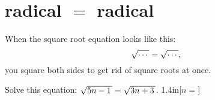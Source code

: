 \section{radical $=$ radical}

\begin{tcolorbox}[center,width=5in,colback=white]
    When the square root equation looks like this:
    {
    \[
        \myRoot{\cdots} = \myRoot{\cdots}\text{,}
    \]
    }%
    you {square} {both} {sides} 
    to get rid of  square roots at once.
\end{tcolorbox}

\myWideProblem
{
    Solve this equation: \quad $\myRoot{5n-1} = \myRoot{3n+3}$.
}{1.4in}[\raggedleft$n=$]